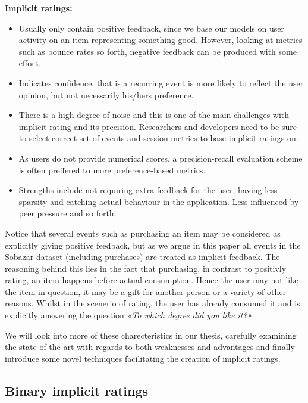 \textbf{Implicit ratings:}
\begin{itemize}
\item Usually only contain positive feedback, since we base our models on user
activity on an item representing something good. However, looking at metrics
such as bounce rates so forth, negative feedback can be produced with some
effort.
\item Indicates confidence, that is a recurring event is more likely to reflect
the user opinion, but not necessarily his/hers preference.
\item There is a high degree of noise and this is one of the main challenges
with implicit rating and its precision. Researchers and developers need to be
sure to select correct set of events and session-metrics to base implicit
ratings on.
\item As users do not provide numerical scores, a precision-recall evaluation
scheme is often preffered to more preference-based metrics.
\item Strengths include not requiring extra feedback for the user, having less
sparsity and catching actual behaviour in the application. Less influenced by
peer pressure and so forth.
\end{itemize}

Notice that several events such as purchasing an item may be considered as
explicitly giving positive feedback, but as we argue in this paper all events
in the Sobazar dataset (including purchases) are treated as implicit feedback.
The reasoning behind this lies in the fact that purchasing, in contrast to
positivly rating, an item happens before actual consumption. Hence the user may
not like the item in question, it may be a gift for another person or a variety
of other reasons. Whilst in the scenerio of rating, the user has already
consumed it and is explicitly answering the question \textit{«To which degree
did you like it?»}.

We will look into more of these charecteristics in our thesis, carefully
examining the state of the art with regards to both weaknesses and advantages
and finally introduce some novel techniques facilitating the creation of
implicit ratings.

\clearpage

\subsection{Binary implicit ratings}

